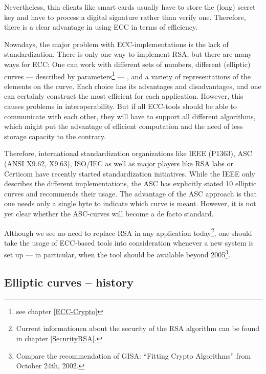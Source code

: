 Nevertheless, thin clients like smart cards usually have to store the (long)
secret key and have to process a digital signature rather than verify one.
Therefore, there is a clear advantage in using ECC in terms of efficiency.
\par
\smallskip
Nowadays, the major problem with ECC-implementations is the lack of standardization.
There is only one way to implement RSA, but there are many ways for ECC: One can work with
different sets of numbers, different (elliptic) curves --- described by parameters\footnote{%
see chapter \ref{ECC-Crypto}
} --- ,
and a variety of representations of the elements on the curve. Each choice has its
advantages and disadvantages, and one can certainly construct the most efficient for
each application. However, this causes problems in interoperability. But if all
ECC-tools should be able to communicate with each other, they will have to support
all different algorithms, which might put the advantage of efficient computation and
the need of less storage capacity to the contrary.

Therefore, international standardization organizations like IEEE (P1363),
ASC (ANSI X9.62, X9.63), ISO/IEC as well as major players like RSA labs or
Certicom have recently started standardization initiatives. While the IEEE
only describes the different implementations, the ASC has explicitly stated
10 elliptic curves and recommends their usage. The advantage of the ASC
approach is that one needs only a single byte to indicate which curve is
meant. However, it is not yet clear whether the ASC-curves will become a de
facto standard.

Although we see no need to replace RSA in any application today\footnote{%
Current informationen about the security of the RSA algorithm can be found in 
chapter \ref{SecurityRSA}.}, one should
take the usage of ECC-based tools into consideration whenever a new system
is set up --- in particular, when the tool should be available beyond 2005\footnote{%
Compare the recommendation of GISA: ``Fitting Crypto Algorithms'' from October 24th, 2002.
}.


\subsection{Elliptic curves -- history}

